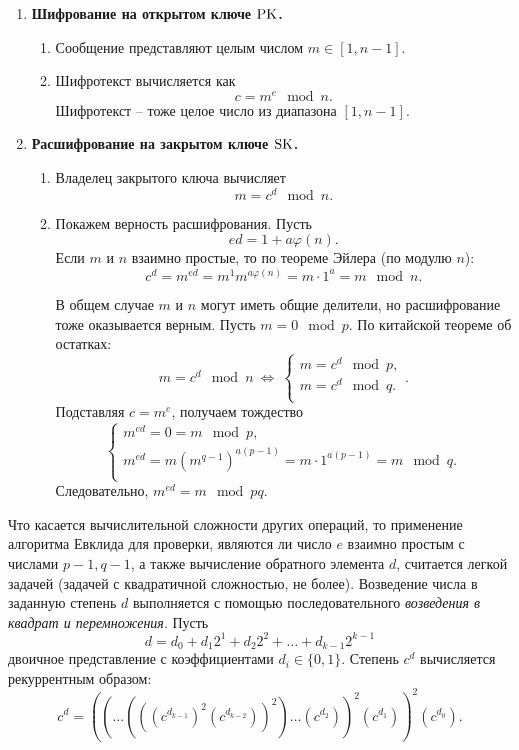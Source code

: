 \begin{enumerate}
    \item \textbf{Шифрование на открытом ключе $\textrm{PK}$.}
        \begin{enumerate}
            \item Сообщение представляют целым числом $m \in [1, n-1]$.
            \item Шифротекст вычисляется как
                \[ c = m^e \mod n. \]
                Шифротекст -- тоже целое число из диапазона $[1, n-1]$.
        \end{enumerate}
    \item \textbf{Расшифрование на закрытом ключе $\textrm{SK}$.}
        \begin{enumerate}
            \item Владелец закрытого ключа вычисляет
                \[ m = c^d \mod n. \]
            \item Покажем верность расшифрования. Пусть
                \[ ed = 1 + a \varphi(n). \]
                Если $m$ и $n$ взаимно простые, то по теореме Эйлера (по модулю $n$):
                \[ c^d = m ^{ed} = m^1 m^{a\varphi(n)} = m \cdot 1^a = m \mod n. \]

                В общем случае $m$ и $n$ могут иметь общие делители, но расшифрование тоже оказывается верным. Пусть $m = 0 \mod p$. По китайской теореме об остатках:
                \[
                     m = c^d \mod n ~\Leftrightarrow~
                     \left\{ \begin{array}{l}
                        m = c^d \mod p, \\
                        m = c^d \mod q. \\
                     \end{array} \right..
                \]
                Подставляя $c=m^e$, получаем тождество
                \[ \left\{ \begin{array}{l}
                    m^{ed} = 0 = m \mod p, \\
                    m^{ed} = m  \left( m^{q-1} \right)^{a(p-1)} = m \cdot 1^{a(p-1)} = m \mod q. \\
                \end{array} \right. \]
                Следовательно, $m^{ed} = m \mod pq$.
        \end{enumerate}
\end{enumerate}


Что касается вычислительной сложности других операций, то применение алгоритма Евклида для проверки, являются ли число $e$  взаимно простым с числами $p-1, q-1$, а также вычисление обратного элемента $d$, считается легкой задачей (задачей с квадратичной сложностью, не более).
Возведение числа в заданную степень $d$ выполняется с помощью последовательного \emph{возведения в квадрат и перемножения}. Пусть
    \[ d = d_0 + d_1 2^1 + d_2 2^2 + \ldots + d_{k-1} 2^{k-1} \]
двоичное представление с коэффициентами $d_{i} \in \{ 0, 1 \}$. Степень $c^d$ вычисляется рекуррентным образом:
  \[ c^d =((... (((c^ {d_{k-1}})^2  (c^{d_{k-2}}))^2)\dots(c^{d_2}))^2 (c^{d_1}))^2 (c^{d_0}).\]

